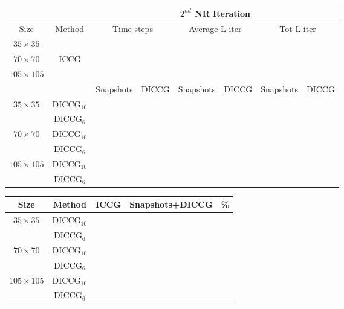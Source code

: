 \documentclass[a4paper,10pt]{article}
\begin{document}
\begin{table}[!ht]\centering
\begin{minipage}{1\textwidth}
\vspace{-10pt}
\centering
\begin{tabular}{ |c|c|c|c|c|c|c|c|} 
  \hline
 & & \multicolumn{6}{|c|}{$2^{nd}$ NR Iteration}  \\
\hline
Size&Method&  \multicolumn{2}{|c|}{Time steps} &\multicolumn{2}{|c|}{Average L-iter} & \multicolumn{2}{|c|}{Tot L-iter}\\
\hline
$35\times35$& &\multicolumn{2}{|c|}{} & \multicolumn{2}{|c|}{}& \multicolumn{2}{|c|}{} \\

$70\times70$&ICCG&\multicolumn{2}{|c|}{}& \multicolumn{2}{|c|}{}& \multicolumn{2}{|c|}{}\\

$105\times105$& & \multicolumn{2}{|c|}{} &\multicolumn{2}{|c|}{} & \multicolumn{2}{|c|}{}\\
\hline
&&Snapshots&DICCG&Snapshots&DICCG&Snapshots&DICCG\\
\hline
$35\times35$&DICCG$_{10}$&&&&&& \\
&DICCG$_6$&&&&&& \\
\hline
$70\times70$&DICCG$_{10}$ && &&&& \\
&DICCG$_6$ &&&& &&\\
\hline
$105\times105$&DICCG$_{10}$ && && && \\
&DICCG$_6$&& && && \\
\hline
 \end{tabular}
\end{minipage}
\end{table}



\begin{table}[!h]
\begin{minipage}{1\textwidth}
\vspace{-10pt}
\centering
\begin{tabular}{ |c|c|c|c|c|} 

\hline
Size&Method& ICCG & Snapshots+DICCG &\% \\
\hline
$35\times35$ &DICCG$_{10}$& &  & \\
&DICCG$_6$& &  & \\
\hline
$70\times70$ &DICCG$_{10}$& &  & \\
 &DICCG$_6$& &  & \\
\hline
$105\times105$ &DICCG$_{10}$& &  & \\
 &DICCG$_6$& &  & \\
 \hline
 \end{tabular}
\end{minipage}
\end{table}
\end{document}
